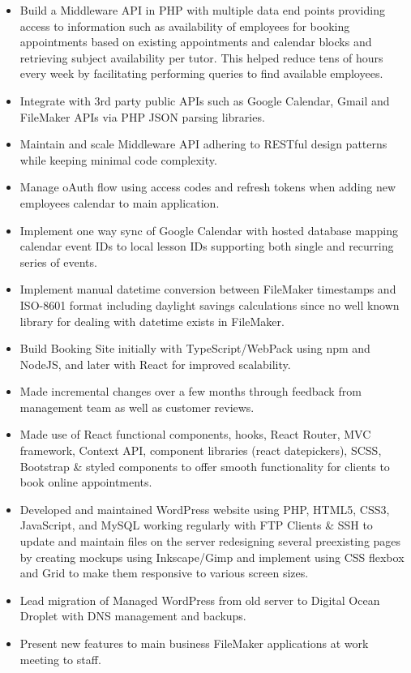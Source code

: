 \documentclass{resume}
\begin{document}
\begin{itemize}
\vspace{5pt}

\item \small \raggedright Build a Middleware API in PHP with multiple data end points providing access to information such as availability of employees for booking appointments based on existing appointments and calendar blocks and retrieving subject availability per tutor. This helped reduce tens of hours every week by facilitating performing queries to find available employees.
\item \small \raggedright Integrate with 3rd party public APIs such as Google Calendar, Gmail and FileMaker APIs via PHP JSON parsing libraries.
\item \small \raggedright Maintain and scale Middleware API adhering to RESTful design patterns while keeping minimal code complexity.
\item \small \raggedright Manage oAuth flow using access codes and refresh tokens when adding new employees calendar to main application.
\item \small \raggedright Implement one way sync of Google Calendar with hosted database mapping calendar event IDs to local lesson IDs supporting both single and recurring series of events.
\item \small \raggedright Implement manual datetime conversion between FileMaker timestamps and ISO-8601 format including daylight savings calculations since no well known library for dealing with datetime exists in FileMaker.

\vspace{5pt}

\item \small \raggedright Build Booking Site initially with TypeScript/WebPack using npm and NodeJS, and later with React for improved scalability.
\item \small \raggedright Made incremental changes over a few months through feedback from management team as well as customer reviews.
\item \small \raggedright Made use of React functional components, hooks, React Router, MVC framework, Context API, component libraries (react datepickers), SCSS, Bootstrap \& styled components to offer smooth functionality for clients to book online appointments.
\item \small \raggedright Developed and maintained WordPress website using PHP, HTML5, CSS3, JavaScript, and MySQL working regularly with FTP Clients \& SSH to update and maintain files on the server redesigning several preexisting pages by creating mockups using Inkscape/Gimp and implement using CSS flexbox and Grid to make them responsive to various screen sizes.
\item \small \raggedright Lead migration of Managed WordPress from old server to Digital Ocean Droplet with DNS management and backups.
\item \small \raggedright Present new features to main business FileMaker applications at work meeting to staff.
\end{itemize}
\end{document}
